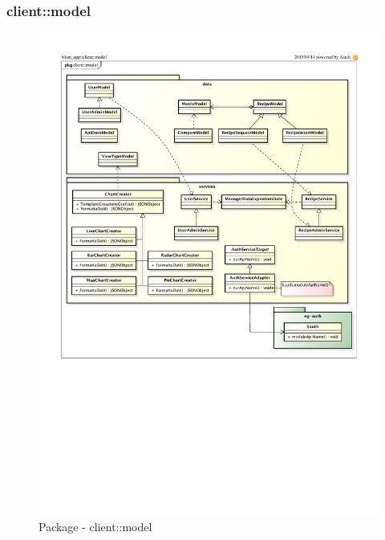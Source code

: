 %
%



\subsubsection{client::model} %
\label{ssub:bdsm_app_client_model}
\begin{figure}[htbp]
	\centering
	\centerline{\includegraphics[scale=0.9]{./images/client/client_model.pdf}}
	\caption{Package - client::model}
\end{figure}


